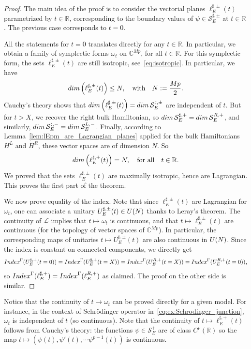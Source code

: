 \documentclass[11pt]{amsart}
\numberwithin{equation}{section} %
\newcommand\1{{\mathds 1}}
\def\C{{\mathbb C}}
\def\R{{\mathbb R}}
\def\cL{{\mathcal L}}
\def\cS{{\mathcal S}}
\def\U{{\rm U}}
\def\Index{{\rm Index}}
\def\dim{{\rm dim }}
\begin{document}
\begin{proof}
    The main idea of the proof is to consider the vectorial planes $\ell_E^{\sharp, \pm}(t)$ parametrized by $t \in \R$, corresponding  to the boundary values of $\psi \in \cS_E^{\sharp, \pm}$ at $t \in \R$. The previous case corresponds to $t = 0$.
    
    \medskip
    
    All the statements for $t= 0$ translates directly for any $t \in \R$. In particular, we obtain a family of symplectic forms $\omega_t$ on $\C^{Mp}$, for all $t \in \R$. For this symplectic form, the sets $\ell_E^{\sharp, \pm}(t)$ are still isotropic, see~\eqref{eq:isotropic}. In particular, we have 
    \[
        \dim \left( \ell_E^{\sharp, \pm}(t) \right) \le N, \quad \text{with} \quad N := \frac{Mp}{2}.
    \]    
    Cauchy's theory shows that $\dim \left( \ell_E^{\sharp, \pm}(t) \right) = \dim \, \cS_E^{\sharp, \pm}$ are independent of $t$. But for $t > X$, we recover the right bulk Hamiltonian, so $\dim \, \cS_E^{\sharp, +} = \dim \, \cS_E^{R, +}$, and similarly, $\dim \, \cS_E^{\sharp, -} = \dim \, \cS_E^{L, -}$. Finally, according to Lemma~\ref{lem:lEpm_are_Lagrangian_planes} applied for the bulk Hamiltonians $H^L$ and $H^R$, these vector spaces are of dimension $N$. So 
    \[
        \dim \left( \ell_E^{\sharp, \pm}(t) \right) = N, \quad \text{for all} \quad t \in \R.
    \]
    We proved that the sets $\ell_E^{\sharp, \pm}(t)$ are maximally isotropic, hence are Lagrangian. This proves the first part of the theorem.
    
    \medskip
    
    We now prove equality of the index. Note that since $\ell_E^{\sharp, \pm}(t)$ are Lagrangian for $\omega_t$, one can associate a unitary $U_E^{\sharp, \pm}(t) \in \U(N)$ thanks to Leray's theorem. The continuity of $\cL$ implies that $t \mapsto \omega_t$ is continuous, and that $t \mapsto \ell_E^{\sharp, \pm}(t)$ are continuous (for the topology of vector spaces of $\C^{Mp}$). In particular, the corresponding maps of unitaries $t \mapsto U_E^{\sharp, \pm}(t)$ are also continuous in $\U(N)$. Since the index is constant on connected components, we directly get
    \[
        \Index^\Gamma( U_E^{\sharp, +}(t = 0) ) = 
        \Index^\Gamma( U_E^{\sharp, +}(t = X) )  = 
        \Index^\Gamma( U_E^{R, +}(t = X) ) = \Index^\Gamma( U_E^{R, +}(t = 0) ),
    \]
    so $ \Index^\Gamma(\ell_E^{\sharp, +}) = \Index^\Gamma(\ell_E^{R, +})$ as claimed. The proof on the other side is similar.
\end{proof}
Notice that the continuity of $t \mapsto \omega_t$ can be proved directly for a given model. For instance, in the context of Schrödinger operator in~\eqref{eq:ex:Schrodinger_junction}, $\omega_t$ is independent of $t$ (so continuous). Note that the continuity of $t \mapsto \ell_E^{\sharp, +}(t)$ follows from Cauchy's theory: the functions $\psi \in \cS_E^+$ are of class $C^p(\R)$ so the map $t \mapsto (\psi(t), \psi'(t),\cdots \psi^{p-1}(t))$ is continuous.
\end{document}
